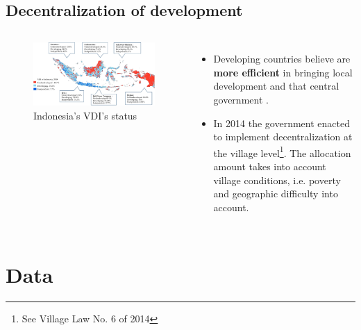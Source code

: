 \documentclass[
11pt,notheorems,compress,hyperref={pdfauthor=Maghfira Ramadhani}
]{beamer}
\begin{document}
\subsection{Decentralization of development}
\begin{frame}
    \begin{columns}[T,onlytextwidth]
      \begin{figure}[t]
        \includegraphics[scale=0.205]{Final_Project/image/vdi2018.jpg}
        \caption{Indonesia's VDI's status}
        \label{f:graph3}
        \end{figure}
        \begin{itemize}
            \item Developing countries believe  are \alert{\textbf{more efficient}} in bringing local development \citep{vazquez_2017} and  that central government \citep{arends2020}.
            \pause\item In 2014 the government enacted  to implement decentralization at the village level\footnote{See Village Law No. 6 of 2014}. The allocation amount takes into account village conditions, i.e. poverty and geographic difficulty into account.
        \end{itemize}
    \end{columns}
\end{frame}

\section{Data}
\end{document}
